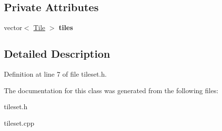 \subsection*{Private Attributes}
\begin{DoxyCompactItemize}
\item 
vector$<$ \hyperlink{classTile}{Tile} $>$ {\bfseries tiles}\hypertarget{classTileset_adeb7a1446a0f6d7ac4bf09602fe81c3f}{}\label{classTileset_adeb7a1446a0f6d7ac4bf09602fe81c3f}

\end{DoxyCompactItemize}


\subsection{Detailed Description}


Definition at line 7 of file tileset.\+h.



The documentation for this class was generated from the following files\+:\begin{DoxyCompactItemize}
\item 
tileset.\+h\item 
tileset.\+cpp\end{DoxyCompactItemize}
